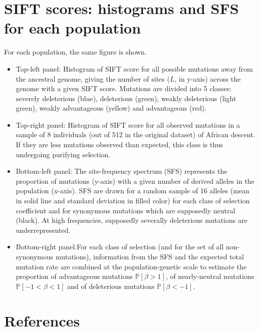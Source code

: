 \documentclass{article}
\newcommand{\proba}{\mathbb{P}}
\newcommand{\Sphy}{S}
\newcommand{\Spop}{\beta}
\newcommand{\polyDel}{\Spop < -1}
\newcommand{\polyNeutral}{-1 < \Spop < 1}
\newcommand{\polyAdv}{ \Spop > 1}
\newcommand{\PpolyDel}{\proba \left[ \polyDel \right]}
\newcommand{\PpolyNeutral}{\proba \left[ \polyNeutral \right]}
\newcommand{\PpolyAdv}{\proba \left[ \polyAdv \right]}
\begin{document}


    \section{SIFT scores: histograms and SFS for each population}\label{sec:sift-scores:-histograms-and-sfs-for-each-population}
    For each population, the same figure is shown.
    \begin{itemize}
        \item Top-left panel: Histogram of SIFT score for all possible mutations away from the ancestral genome, giving the number of sites ($L$, in y-axis) across the genome with a given SIFT score.
        Mutations are divided into 5 classes: severely deleterious (blue), deleterious (green), weakly deleterious (light green), weakly advantageous (yellow) and advantageous (red).
        \item Top-right panel: Histogram of SIFT score for all observed mutations in a sample of 8 individuals (out of 512 in the original dataset) of African descent.
        If they are less mutations observed than expected, this class is thus undergoing purifying selection.
        \item Bottom-left panel: The site-frequency spectrum (SFS) represents the proportion of mutations (y-axis) with a given number of derived alleles in the population (x-axis).
        SFS are drawn for a random sample of 16 alleles (mean in solid line and standard deviation in filled color) for each class of selection coefficient and for synonymous mutations which are supposedly neutral (black).
        At high frequencies, supposedly severally deleterious mutations are underrepresented.
        \item Bottom-right panel:For each class of selection (and for the set of all non-synonymous mutations), information from the SFS and the expected total mutation rate are combined at the population-genetic scale to estimate the proportion of advantageous mutations $\PpolyAdv$, of nearly-neutral mutations $\PpolyNeutral$ and of deleterious mutations $\PpolyDel$.
    \end{itemize}
    

    \section*{References}
    \printbibliography
\end{document}
